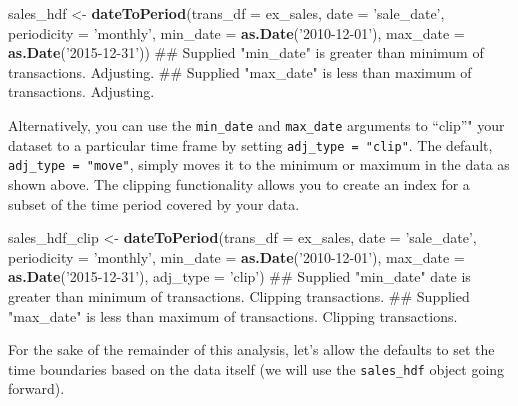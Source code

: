 \documentclass[]{article}
\newenvironment{Shaded}{\begin{snugshade}}{\end{snugshade}}
\newcommand{\KeywordTok}[1]{\textcolor[rgb]{0.13,0.29,0.53}{\textbf{#1}}}
\newcommand{\DataTypeTok}[1]{\textcolor[rgb]{0.13,0.29,0.53}{#1}}
\newcommand{\StringTok}[1]{\textcolor[rgb]{0.31,0.60,0.02}{#1}}
\newcommand{\NormalTok}[1]{#1}
\begin{document}
\begin{Shaded}
\begin{Highlighting}[]
\NormalTok{  sales_hdf <-}\StringTok{ }\KeywordTok{dateToPeriod}\NormalTok{(}\DataTypeTok{trans_df =}\NormalTok{ ex_sales,}
                            \DataTypeTok{date =} \StringTok{'sale_date'}\NormalTok{,}
                            \DataTypeTok{periodicity =} \StringTok{'monthly'}\NormalTok{,}
                            \DataTypeTok{min_date =} \KeywordTok{as.Date}\NormalTok{(}\StringTok{'2010-12-01'}\NormalTok{),}
                            \DataTypeTok{max_date =} \KeywordTok{as.Date}\NormalTok{(}\StringTok{'2015-12-31'}\NormalTok{))}
\NormalTok{## Supplied "min_date" is greater than minimum of transactions. Adjusting.}
\NormalTok{## Supplied "max_date" is less than maximum of transactions. Adjusting.}
\end{Highlighting}
\end{Shaded}

Alternatively, you can use the \texttt{min\_date} and \texttt{max\_date}
arguments to ``clip''" your dataset to a particular time frame by
setting \texttt{adj\_type\ =\ "clip"}. The default,
\texttt{adj\_type\ =\ "move"}, simply moves it to the minimum or maximum
in the data as shown above. The clipping functionality allows you to
create an index for a subset of the time period covered by your data.

\begin{Shaded}
\begin{Highlighting}[]
\NormalTok{  sales_hdf_clip <-}\StringTok{ }\KeywordTok{dateToPeriod}\NormalTok{(}\DataTypeTok{trans_df =}\NormalTok{ ex_sales,}
                                 \DataTypeTok{date =} \StringTok{'sale_date'}\NormalTok{,}
                                 \DataTypeTok{periodicity =} \StringTok{'monthly'}\NormalTok{,}
                                 \DataTypeTok{min_date =} \KeywordTok{as.Date}\NormalTok{(}\StringTok{'2010-12-01'}\NormalTok{),}
                                 \DataTypeTok{max_date =} \KeywordTok{as.Date}\NormalTok{(}\StringTok{'2015-12-31'}\NormalTok{),}
                                 \DataTypeTok{adj_type =} \StringTok{'clip'}\NormalTok{)}
\NormalTok{## Supplied "min_date" date is greater than minimum of transactions. Clipping transactions.}
\NormalTok{## Supplied "max_date" is less than maximum of transactions. Clipping transactions.}
\end{Highlighting}
\end{Shaded}

For the sake of the remainder of this analysis, let's allow the defaults
to set the time boundaries based on the data itself (we will use the
\texttt{sales\_hdf} object going forward).
\end{document}
